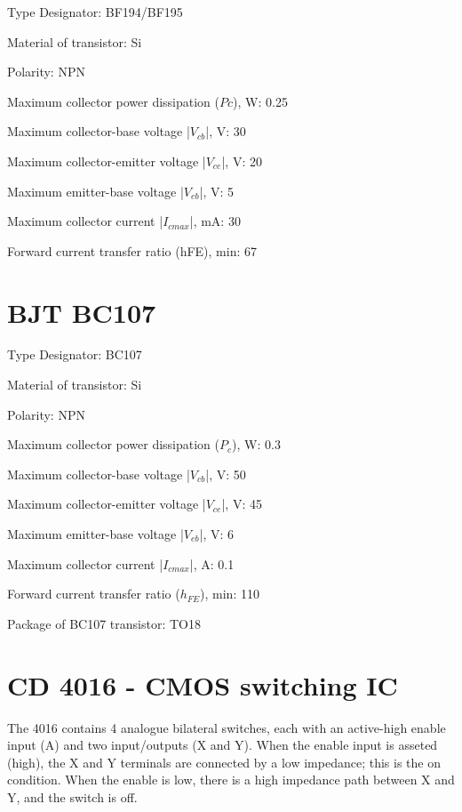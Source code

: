 Type Designator: BF194/BF195

Material of transistor: Si

Polarity: NPN

Maximum collector power dissipation ($Pc$), W: 0.25

Maximum collector-base voltage |$V_{cb}$|, V: 30

Maximum collector-emitter voltage |$V_{ce}$|, V: 20

Maximum emitter-base voltage |$V_{eb}$|, V: 5

Maximum collector current |$I_{c max}$|, mA: 30

Forward current transfer ratio (hFE), min: 67


\section{BJT BC107}
\label{BC107}
\noindent Type Designator: BC107

Material of transistor: Si

Polarity: NPN

Maximum collector power dissipation ($P_c$), W: 0.3

Maximum collector-base voltage |$V_{cb}$|, V: 50

Maximum collector-emitter voltage |$V_{ce}$|, V: 45

Maximum emitter-base voltage |$V_{eb}$|, V: 6

Maximum collector current |$I_{cmax}$|, A: 0.1

Forward current transfer ratio ($h_{FE}$), min: 110

Package of BC107 transistor: TO18



\section{CD 4016 - CMOS switching IC}
\label{4016}
The 4016 contains 4 analogue bilateral switches, each with an active-high enable input (A) and two input/outputs (X and Y). When the enable input is asseted (high), the X and Y terminals are connected by a low impedance; this is the on condition. When the enable is low, there is a high impedance path between X and Y, and the switch is off.

